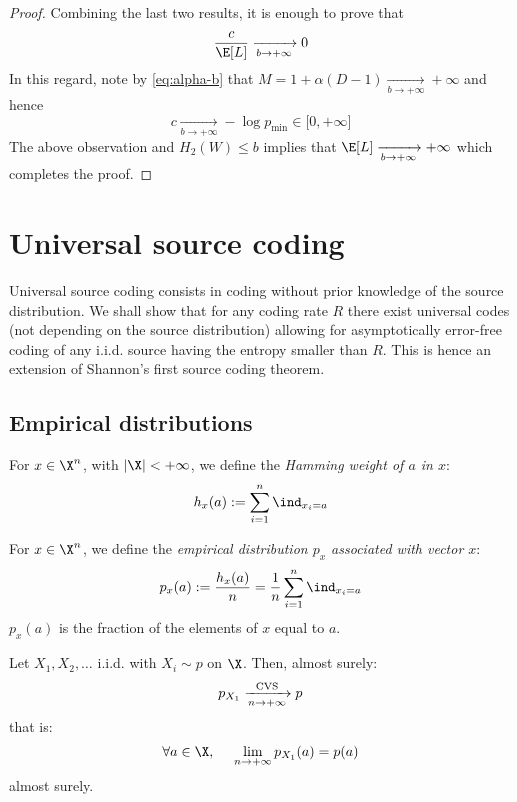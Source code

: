 \documentclass[toc]{../cs-classes/cs-classes}
\begin{document}
\begin{proof}
    Combining the last two results, it is enough to prove that
    \begin{equation*}
        \frac{c}{\E[L]} \xrightarrow[b\to+\infty]{} 0
    \end{equation*}
    In this regard, note by \eqref{eq:alpha-b} that $M=1+\alpha(D-1) \xrightarrow[b\to+\infty]{} +\infty$ and hence
    \begin{equation*}
        c \xrightarrow[b\to+\infty]{} -\log p_{\min} \in \lbrack0, +\infty\rbrack
    \end{equation*}
    The above observation and $H_2(W)\leq b$ implies that $\E[L] \xrightarrow[b\to+\infty]{} +\infty$ which completes the proof.
\end{proof}

\section{Universal source coding}
Universal source coding consists in coding without prior knowledge of the source distribution. We shall show that for any coding rate $R$ there exist universal codes (not depending on the source distribution) allowing for asymptotically error-free coding of any i.i.d. source having the entropy smaller than $R$. This is hence an extension of Shannon's first source coding theorem.

\subsection{Empirical distributions}
\begin{definition}
    For $x\in\X^n$, with $|\X|<+\infty$, we define the \emph{Hamming weight of $a$ in $x$}:
    \begin{equation*}
        h_x(a) := \sum_{i=1}^n \ind_{x_i=a}
    \end{equation*}
\end{definition}

\begin{definition}
    For $x\in\X^n$, we define the \emph{empirical distribution $p_x$ associated with vector $x$}:
    \begin{equation*}
        p_x(a) := \frac{h_x(a)}{n}=\frac{1}{n}\sum_{i=1}^n \ind_{x_i=a}
    \end{equation*}
    $p_x(a)$ is the fraction of the elements of $x$ equal to $a$.
\end{definition}

\begin{property}
    \label{prop:glivenko-cantelli}
    Let $X_1, X_2, \dots$ i.i.d. with $X_i\sim p$ on $\X$. Then, almost surely:
    \begin{equation*}
        p_{X_1} \xrightarrow[n\to+\infty]{\textnormal{CVS}} p
    \end{equation*}
    that is:
    \begin{equation*}
        \forall a\in\X, \quad \lim_{n\to+\infty}p_{X_1}(a)=p(a)
    \end{equation*}
    almost surely.
\end{property}
\end{document}

